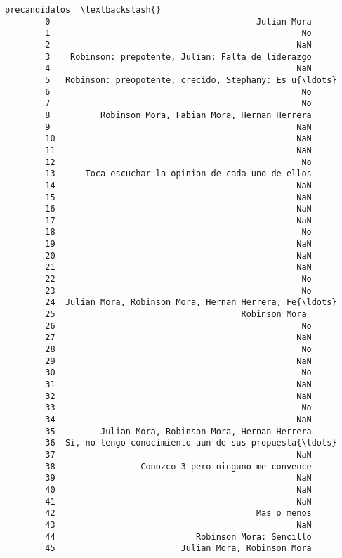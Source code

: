 \documentclass[11pt]{article}
\begin{document}
\begin{Verbatim}[commandchars=\\\{\}]
                                                precandidatos  \textbackslash{}
        0                                         Julian Mora   
        1                                                  No   
        2                                                 NaN   
        3    Robinson: prepotente, Julian: Falta de liderazgo   
        4                                                 NaN   
        5   Robinson: preopotente, crecido, Stephany: Es u{\ldots}   
        6                                                  No   
        7                                                  No   
        8          Robinson Mora, Fabian Mora, Hernan Herrera   
        9                                                 NaN   
        10                                                NaN   
        11                                                NaN   
        12                                                 No   
        13      Toca escuchar la opinion de cada uno de ellos   
        14                                                NaN   
        15                                                NaN   
        16                                                NaN   
        17                                                NaN   
        18                                                 No   
        19                                                NaN   
        20                                                NaN   
        21                                                NaN   
        22                                                 No   
        23                                                 No   
        24  Julian Mora, Robinson Mora, Hernan Herrera, Fe{\ldots}   
        25                                     Robinson Mora    
        26                                                 No   
        27                                                NaN   
        28                                                 No   
        29                                                NaN   
        30                                                 No   
        31                                                NaN   
        32                                                NaN   
        33                                                 No   
        34                                                NaN   
        35         Julian Mora, Robinson Mora, Hernan Herrera   
        36  Si, no tengo conocimiento aun de sus propuesta{\ldots}   
        37                                                NaN   
        38                 Conozco 3 pero ninguno me convence   
        39                                                NaN   
        40                                                NaN   
        41                                                NaN   
        42                                        Mas o menos   
        43                                                NaN   
        44                            Robinson Mora: Sencillo   
        45                         Julian Mora, Robinson Mora   
        

\end{Verbatim}
\end{document}
